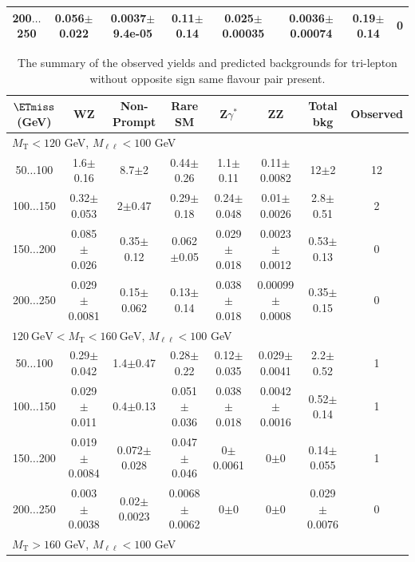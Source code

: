 \begin{landscape}
\begin{table}
\begin{center}
\begin{tabular}{| c | c c c c c c c | }
200$\dots$250&0.056$\pm$0.022&0.0037$\pm$9.4e-05&0.11$\pm$0.14&0.025$\pm$0.00035&0.0036$\pm$0.00074&0.19$\pm$0.14&0\\
\hline\hline
\end{tabular}
\end{center}
\end{table}
\begin{table}
\small
\begin{center}
\caption{\label{tab:OSSF0tau0} The summary of the observed yields and predicted backgrounds for tri-lepton without opposite sign same flavour pair present. }
\begin{tabular}{| c | c c c c c c c | }\hline\hline
$\ETmiss$ (GeV) & WZ & Non-Prompt & Rare SM & Z$\gamma^*$ & ZZ & Total bkg & Observed\\\hline\hline
\multicolumn{8}{l}{$M_{\text{T}} < 120$ GeV, $M_{\ell\ell} < 100$ GeV}\\\hline\hline
50$\dots$100&1.6$\pm$0.16&8.7$\pm$2&0.44$\pm$0.26&1.1$\pm$0.11&0.11$\pm$0.0082&12$\pm$2&12\\
100$\dots$150&0.32$\pm$0.053&2$\pm$0.47&0.29$\pm$0.18&0.24$\pm$0.048&0.01$\pm$0.0026&2.8$\pm$0.51&2\\
150$\dots$200&0.085$\pm$0.026&0.35$\pm$0.12&0.062$\pm$0.05&0.029$\pm$0.018&0.0023$\pm$0.0012&0.53$\pm$0.13&0\\
200$\dots$250&0.029$\pm$0.0081&0.15$\pm$0.062&0.13$\pm$0.14&0.038$\pm$0.018&0.00099$\pm$0.0008&0.35$\pm$0.15&0\\
\hline\hline
\multicolumn{8}{l}{$120~\mathrm{GeV} < M_{\text{T}} < 160~\mathrm{GeV}$, $M_{\ell\ell} < 100$ GeV}\\\hline\hline
50$\dots$100&0.29$\pm$0.042&1.4$\pm$0.47&0.28$\pm$0.22&0.12$\pm$0.035&0.029$\pm$0.0041&2.2$\pm$0.52&1\\
100$\dots$150&0.029$\pm$0.011&0.4$\pm$0.13&0.051$\pm$0.036&0.038$\pm$0.018&0.0042$\pm$0.0016&0.52$\pm$0.14&1\\
150$\dots$200&0.019$\pm$0.0084&0.072$\pm$0.028&0.047$\pm$0.046&0$\pm$0.0061&0$\pm$0&0.14$\pm$0.055&1\\
200$\dots$250&0.003$\pm$0.0038&0.02$\pm$0.0023&0.0068$\pm$0.0062&0$\pm$0&0$\pm$0&0.029$\pm$0.0076&0\\
\hline\hline
\multicolumn{8}{l}{$M_{\text{T}} > 160$ GeV, $M_{\ell\ell} < 100$ GeV}\\\hline\hline

\end{tabular}
\end{center}
\end{table}
\end{landscape}
